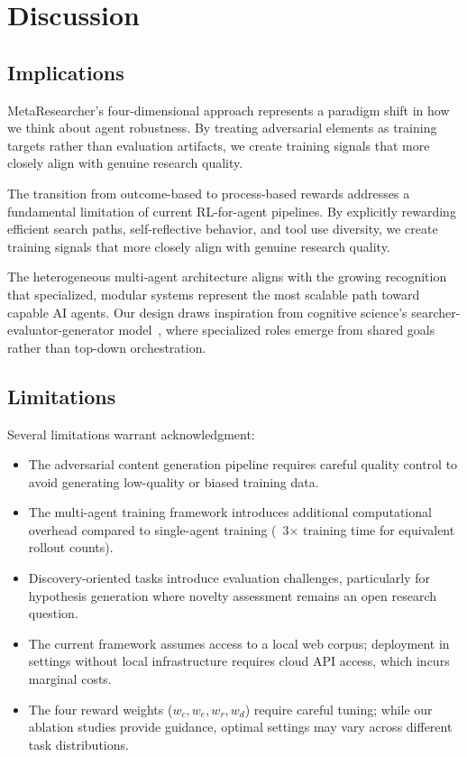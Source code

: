 \documentclass[notspecified,article,accept,pdftex,moreauthors]{Definitions/mdpi}
\begin{document}
\section{Discussion}
\label{sec:discussion}
\subsection{Implications}
MetaResearcher's four-dimensional approach represents a paradigm shift in how we think about agent robustness. By treating adversarial elements as training targets rather than evaluation artifacts, we create training signals that more closely align with genuine research quality.

The transition from outcome-based to process-based rewards addresses a fundamental limitation of current RL-for-agent pipelines. By explicitly rewarding efficient search paths, self-reflective behavior, and tool use diversity, we create training signals that more closely align with genuine research quality.

The heterogeneous multi-agent architecture aligns with the growing recognition that specialized, modular systems represent the most scalable path toward capable AI agents. Our design draws inspiration from cognitive science's searcher-evaluator-generator model~\cite{b62}, where specialized roles emerge from shared goals rather than top-down orchestration.

\subsection{Limitations}
Several limitations warrant acknowledgment:
\begin{itemize}
    \item The adversarial content generation pipeline requires careful quality control to avoid generating low-quality or biased training data.
    \item The multi-agent training framework introduces additional computational overhead compared to single-agent training (~3$\times$ training time for equivalent rollout counts).
    \item Discovery-oriented tasks introduce evaluation challenges, particularly for hypothesis generation where novelty assessment remains an open research question.
    \item The current framework assumes access to a local web corpus; deployment in settings without local infrastructure requires cloud API access, which incurs marginal costs.
    \item The four reward weights ($w_c, w_e, w_r, w_d$) require careful tuning; while our ablation studies provide guidance, optimal settings may vary across different task distributions.
\end{itemize}
\end{document}
